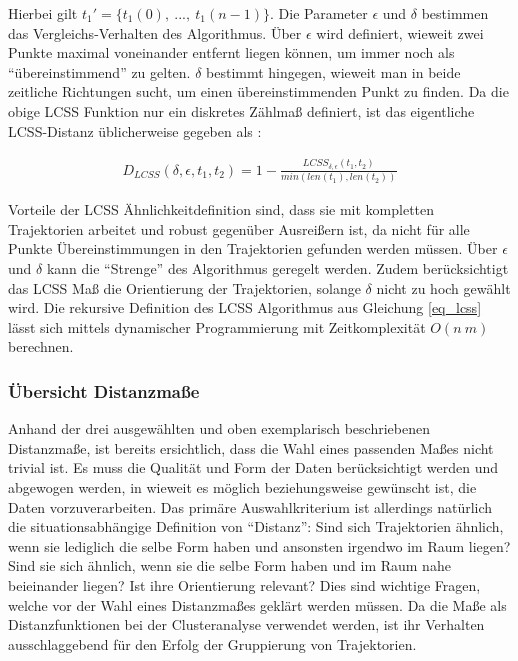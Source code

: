 Hierbei gilt $t_1' = \{ t_1(0),\ ...,\ t_1(n-1)\}$. Die Parameter $\epsilon$ und $\delta$ bestimmen das
Vergleichs-Verhalten des Algorithmus. Über $\epsilon$ wird definiert, wieweit zwei Punkte maximal voneinander entfernt liegen
können, um immer noch als ``übereinstimmend'' zu gelten. $\delta$ bestimmt hingegen, wieweit man in beide zeitliche Richtungen
sucht, um einen übereinstimmenden Punkt zu finden.
Da die obige LCSS Funktion nur ein diskretes Zählmaß definiert, ist das eigentliche LCSS-Distanz üblicherweise
gegeben als \cite[]{Vlachos2002}:

\begin{ceqn}
\begin{align}
\label{eq_lcss_distance}
    D_{LCSS}(\delta, \epsilon, t_1, t_2) = 1 - \frac{LCSS_{\delta, \epsilon}(t_1, t_2)}{min(len(t_1), len(t_2))}
\end{align}
\end{ceqn}


Vorteile der LCSS Ähnlichkeitdefinition sind, dass sie mit kompletten Trajektorien arbeitet und robust
gegenüber Ausreißern ist, da nicht für alle Punkte Übereinstimmungen in den Trajektorien gefunden werden müssen.
Über $\epsilon$ und $\delta$ kann die ``Strenge'' des Algorithmus geregelt werden.
Zudem berücksichtigt das LCSS Maß die Orientierung der Trajektorien, solange $\delta$ nicht zu hoch gewählt wird.
Die rekursive Definition des LCSS Algorithmus aus Gleichung \ref{eq_lcss} lässt sich mittels dynamischer Programmierung
mit Zeitkomplexität $O(n\ m)$ berechnen.

\subsubsection{Übersicht Distanzmaße}

Anhand der drei ausgewählten und oben exemplarisch beschriebenen Distanzmaße, ist bereits ersichtlich,
dass die Wahl eines passenden Maßes nicht trivial ist. Es muss die Qualität und Form der Daten berücksichtigt werden
und abgewogen werden, in wieweit es möglich beziehungsweise gewünscht ist, die Daten vorzuverarbeiten.
Das primäre Auswahlkriterium ist allerdings natürlich die situationsabhängige Definition von ``Distanz'':
Sind sich Trajektorien ähnlich, wenn sie lediglich die selbe Form haben und ansonsten irgendwo im Raum liegen? Sind sie
sich ähnlich, wenn sie die selbe Form haben und im Raum nahe beieinander liegen? Ist ihre Orientierung relevant?
Dies sind wichtige Fragen, welche vor der Wahl eines Distanzmaßes geklärt werden müssen.
Da die Maße als Distanzfunktionen bei der Clusteranalyse verwendet werden, ist ihr Verhalten ausschlaggebend
für den Erfolg der Gruppierung von Trajektorien.

